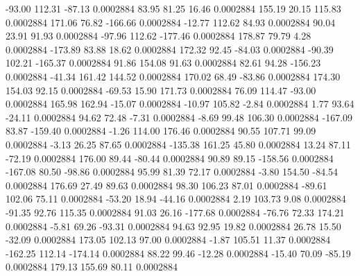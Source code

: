       -93.00      112.31      -87.13     0.0002884
       83.95       81.25       16.46     0.0002884
      155.19       20.15      115.83     0.0002884
      171.06       76.82     -166.66     0.0002884
      -12.77      112.62       84.93     0.0002884
       90.04       23.91       91.93     0.0002884
      -97.96      112.62     -177.46     0.0002884
      178.87       79.79        4.28     0.0002884
     -173.89       83.88       18.62     0.0002884
      172.32       92.45      -84.03     0.0002884
      -90.39      102.21     -165.37     0.0002884
       91.86      154.08       91.63     0.0002884
       82.61       94.28     -156.23     0.0002884
      -41.34      161.42      144.52     0.0002884
      170.02       68.49      -83.86     0.0002884
      174.30      154.03       92.15     0.0002884
      -69.53       15.90      171.73     0.0002884
       76.09      114.47      -93.00     0.0002884
      165.98      162.94      -15.07     0.0002884
      -10.97      105.82       -2.84     0.0002884
        1.77       93.64      -24.11     0.0002884
       94.62       72.48       -7.31     0.0002884
       -8.69       99.48      106.30     0.0002884
     -167.09       83.87     -159.40     0.0002884
       -1.26      114.00      176.46     0.0002884
       90.55      107.71       99.09     0.0002884
       -3.13       26.25       87.65     0.0002884
     -135.38      161.25       45.80     0.0002884
       13.24       87.11      -72.19     0.0002884
      176.00       89.44      -80.44     0.0002884
       90.89       89.15     -158.56     0.0002884
     -167.08       80.50      -98.86     0.0002884
       95.99       81.39       72.17     0.0002884
       -3.80      154.50      -84.54     0.0002884
      176.69       27.49       89.63     0.0002884
       98.30      106.23       87.01     0.0002884
      -89.61      102.06       75.11     0.0002884
      -53.20       18.94      -44.16     0.0002884
        2.19      103.73        9.08     0.0002884
      -91.35       92.76      115.35     0.0002884
       91.03       26.16     -177.68     0.0002884
      -76.76       72.33      174.21     0.0002884
       -5.81       69.26      -93.31     0.0002884
       94.63       92.95       19.82     0.0002884
       26.78       15.50      -32.09     0.0002884
      173.05      102.13       97.00     0.0002884
       -1.87      105.51       11.37     0.0002884
     -162.25      112.14     -174.14     0.0002884
       88.22       99.46      -12.28     0.0002884
      -15.40       70.09      -85.19     0.0002884
      179.13      155.69       80.11     0.0002884
